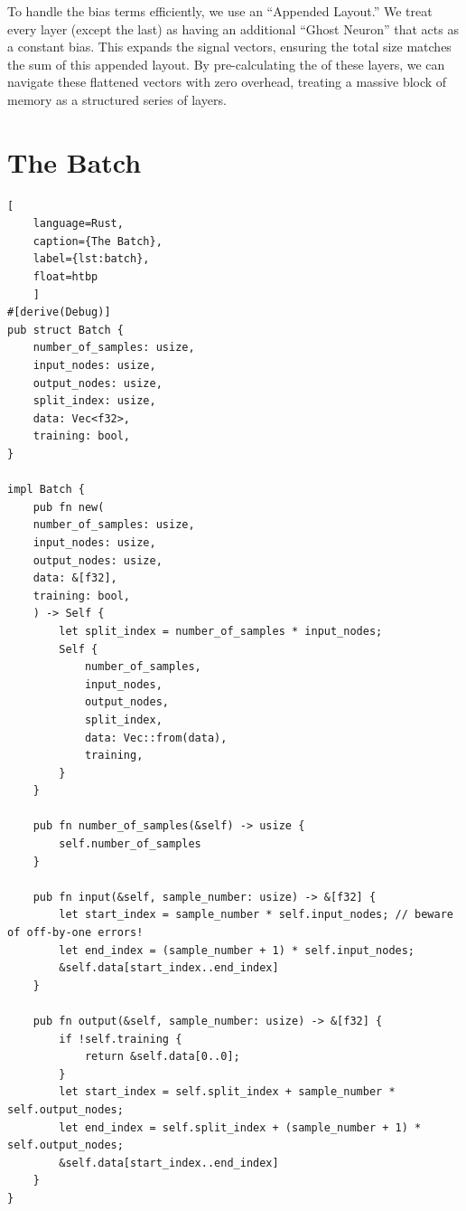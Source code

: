 To handle the bias terms efficiently, we use an \enquote{Appended Layout.} We treat every layer (except the last) as having an additional \enquote{Ghost Neuron} that acts as a constant bias. This expands the signal vectors, ensuring the total size matches the sum of this appended layout. By pre-calculating the  of these layers, we can navigate these flattened vectors with zero overhead, treating a massive block of memory as a structured series of layers.
\newpage\section{The Batch}
\begin{lstlisting}[
	language=Rust, 
	caption={The Batch}, 
	label={lst:batch},
	float=htbp
	]
#[derive(Debug)]
pub struct Batch {
	number_of_samples: usize,
	input_nodes: usize,
	output_nodes: usize,
	split_index: usize,
	data: Vec<f32>,
	training: bool,
}

impl Batch {
	pub fn new(
	number_of_samples: usize,
	input_nodes: usize,
	output_nodes: usize,
	data: &[f32],
	training: bool,
	) -> Self {
		let split_index = number_of_samples * input_nodes;
		Self {
			number_of_samples,
			input_nodes,
			output_nodes,
			split_index,
			data: Vec::from(data),
			training,
		}
	}
	
	pub fn number_of_samples(&self) -> usize {
		self.number_of_samples
	}
	
	pub fn input(&self, sample_number: usize) -> &[f32] {
		let start_index = sample_number * self.input_nodes; // beware of off-by-one errors!
		let end_index = (sample_number + 1) * self.input_nodes;
		&self.data[start_index..end_index]
	}
	
	pub fn output(&self, sample_number: usize) -> &[f32] {
		if !self.training {
			return &self.data[0..0];
		}
		let start_index = self.split_index + sample_number * self.output_nodes;
		let end_index = self.split_index + (sample_number + 1) * self.output_nodes;
		&self.data[start_index..end_index]
	}
}
\end{lstlisting}

